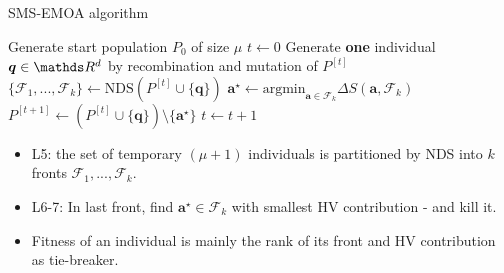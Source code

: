 \documentclass[11pt,compress,t,notes=noshow, xcolor=table]{beamer}
\begin{document}
\begin{vbframe}{SMS-EMOA algorithm}

\vspace*{-0.5cm}

\begin{algorithm}[H]
  \begin{center}
  \caption{SMS-EMOA}
    \begin{algorithmic}[1]
    \begin{footnotesize}
    \State Generate start population $P_0$ of size $\mu$
    \State $t \leftarrow 0$
      \Repeat
        \State Generate \textbf{one} individual $\bm{q} \in \R^d$ by recombination and mutation of $P^{[t]}$
        \State $\{\mathcal{F}_{1},..., \mathcal{F}_k\} \leftarrow\text{NDS}(P^{[t]}\cup \{\bm{q}\})$
        \State $\bm{a}^\star \leftarrow \text{argmin}_{\bm{a} \in \mathcal{F}_{k}}\Delta S(\bm{a}, \mathcal{F}_{k})$
        \State $P^{[t+1]} \leftarrow (P^{[t]} \cup \{\bm{q}\}) \setminus\{\bm{a}^\star\}$
        \State $ t \leftarrow t+1$
    \end{footnotesize}
    \vspace*{-0.3cm}
    \end{algorithmic}
    \end{center}
\end{algorithm}

\vspace*{-0.6cm}
\footnotesize
\begin{itemize}
\item L5: the set of temporary $(\mu + 1)$ individuals is partitioned by NDS into $k$ fronts $\mathcal{F}_{1},...,\mathcal{F}_{k}$.
\item L6-7: In last front, find $\bm{a}^\star \in \mathcal{F}_{k}$ with smallest HV contribution - and kill it.
\item Fitness of an individual is mainly the rank of its front and HV contribution as tie-breaker.
\end{itemize}
\end{vbframe}

\endlecture
\end{document}
